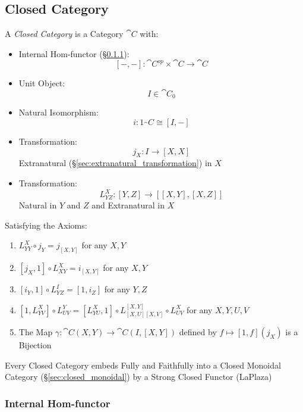 \subsection{Closed Category}\label{sec:closed_category}

A \emph{Closed Category} is a Category $\cat{C}$ with:
\begin{itemize}
  \item Internal Hom-functor (\S\ref{sec:internal_hom}):
    \[
      [-,-]:\cat{C}^{op} \times \cat{C} \rightarrow \cat{C}
    \]
  \item Unit Object:
    \[
      I \in \cat{C}_0
    \]
  \item Natural Isomorphism:
    \[
      i : 1_\cat{C} \cong [I,-]
    \]
  \item Transformation:
    \[
      j_X : I \rightarrow [X,X]
    \]
    Extranatural (\S\ref{sec:extranatural_transformation}) in $X$
  \item Transformation:
    \[
      L_{Y Z}^X : [Y,Z] \rightarrow [[X,Y],[X,Z]]
    \]
    Natural in $Y$ and $Z$ and Extranatural in $X$
\end{itemize}
Satisfying the Axioms:
\begin{enumerate}
  \item $L_{Y Y}^X \circ j_Y = j_{[X,Y]}$ for any $X,Y$
  \item $[j_X,1] \circ L_{X Y}^X = i_{[X,Y]}$ for any $X,Y$
  \item $[i_Y,1] \circ L_{Y Z}^I = [1,i_Z]$ for any $Y,Z$
  \item $[1,L_{Y V}^X] \circ L_{U V}^Y = [L_{Y U}^X,1] \circ L_{[X,U]
    [X,V]}^{[X,Y]} \circ L_{U V}^X$ for any $X,Y,U,V$
  \item The Map $\gamma : \cat{C}(X,Y) \rightarrow \cat{C}(I,[X,Y])$
    defined by $f \mapsto [1,f](j_X)$ is a Bijection
\end{enumerate}

Every Closed Category embeds Fully and Faithfully into a Closed
Monoidal Category (\S\ref{sec:closed_monoidal}) by a Strong Closed
Functor (LaPlaza) %



\subsubsection{Internal Hom-functor}\label{sec:internal_hom}

